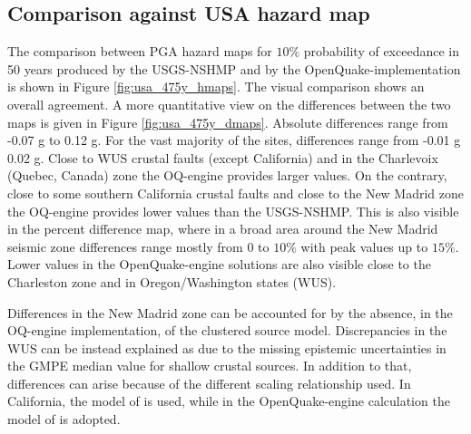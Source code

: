 \subsection{Comparison against USA hazard map}
The comparison between PGA hazard maps for $10\%$ probability of exceedance in 50 years produced by the USGS-NSHMP and by the OpenQuake-implementation is shown in Figure \ref{fig:usa_475y_hmaps}. The visual comparison shows an overall agreement. A more quantitative view on the differences between the two maps is given in Figure \ref{fig:usa_475y_dmaps}. Absolute differences range from -0.07 g to 0.12 g. For the vast majority of the sites, differences range from -0.01 g 0.02 g. Close to WUS crustal faults (except California) and in the Charlevoix (Quebec, Canada) zone the OQ-engine provides larger values. On the contrary, close to some southern California crustal faults and close to the New Madrid zone the OQ-engine provides lower values than the USGS-NSHMP. This is also visible in the percent difference map, where in a broad area around the New Madrid seismic zone differences range mostly from $0$ to $10\%$ with peak values up to $15\%$. Lower values in the OpenQuake-engine solutions are also visible close to the Charleston zone and in Oregon/Washington states (WUS).

Differences in the New Madrid zone can be accounted for by the absence, in the OQ-engine implementation, of the clustered source model. Discrepancies in the WUS can be instead explained as due to the missing epistemic uncertainties in the GMPE median value for shallow crustal sources. In addition to that, differences can arise because of the different scaling relationship used. In California, the model of \cite{hanks2002} is used, while in the OpenQuake-engine calculation the model of \cite{wells1994} is adopted.
